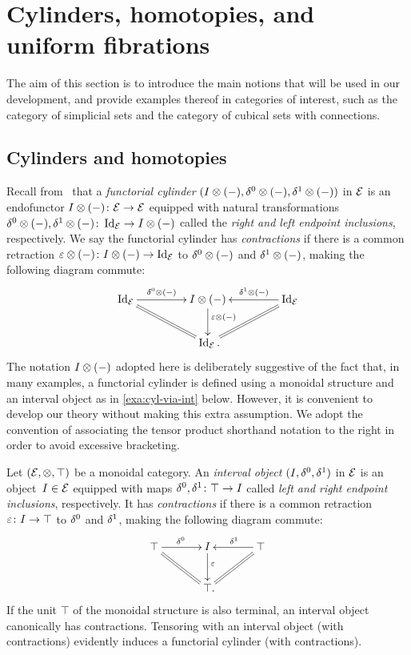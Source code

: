 \documentclass[reqno,10pt,a4paper,oneside,draft]{amsart}
\begin{document}
\section{Cylinders, homotopies, and uniform fibrations}
\label{sec:cylhuf}

The aim of this section is to introduce the main notions that will be used in our development, and provide examples thereof in categories of interest, such as the category of simplicial sets and the category of cubical sets with connections.

\subsection*{Cylinders and homotopies}

Recall from~\cite{kamps-porter:homotopy} that a \emph{functorial cylinder} $(I \otimes (-), \delta^0 \otimes (-), \delta^1 \otimes (-))$ in $\mathcal{E}$ is an endofunctor $I \otimes (-) \colon \mathcal{E} \to \mathcal{E}$ equipped with natural transformations $\delta^0 \otimes (-), \delta^1 \otimes (-) \colon \operatorname{Id}_{\mathcal{E}} \to I \otimes (-)$ called the \emph{right and left endpoint inclusions}, respectively.
We say the functorial cylinder has \emph{contractions} if there is a common retraction $\varepsilon \otimes (-) \colon I \otimes (-) \to \operatorname{Id}_{\mathcal{E}}$ to $\delta^0 \otimes (-)$ and $\delta^1 \otimes (-)$, making the following diagram commute:
\[
\xymatrix@C+2em{
  \Id_\catE
  \ar[r]^-{\lcyl \otimes (-)}
  \ar@{=}[dr]
&
  \interval \otimes (-)
  \ar[d]^(0.4){\ccyl \otimes (-)}
&
  \Id_\catE
  \ar[l]_-{\rcyl \otimes (-)}
  \ar@{=}[dl]
\\&
  \Id_\catE
\rlap{.}}
\]
The notation $I \otimes (-)$ adopted here is deliberately suggestive of the fact that, in many examples, a functorial cylinder is defined using a monoidal structure and an interval object as in \cref{exa:cyl-via-int} below.
However, it is convenient to develop our theory without making this extra assumption.
We adopt the convention of associating the tensor product shorthand notation to the right in order to avoid excessive bracketing.

\begin{example} \label{exa:cyl-via-int}
Let $(\mathcal{E}, \otimes, \top)$ be a monoidal category.
An \emph{interval object} $(I, \delta^0, \delta^1)$ in $\mathcal{E}$ is an object~$I \in \mathcal{E}$ equipped with maps $\delta^0, \delta^1 \colon \top \to I$ called \emph{left and right endpoint inclusions}, respectively.
It has \emph{contractions} if there is a common retraction $\varepsilon \colon I \to \top$ to $\delta^0$ and $\delta^1$, making the following diagram commute:
\[
\xymatrix@C+1em{
  \top
  \ar[r]^{\lcyl}
  \ar@{=}[dr]
&
  \interval
  \ar[d]^(0.4){\ccyl}
&
  \top
  \ar[l]_{\rcyl}
  \ar@{=}[dl]
\\&
  \top
\rlap{.}}
\]
If the unit $\top$ of the monoidal structure is also terminal, an interval object canonically has contractions.
Tensoring with an interval object (with contractions) evidently induces a functorial cylinder (with contractions).
\end{example}
\end{document}
